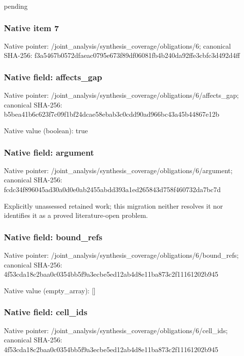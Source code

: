 \documentclass[10pt,a4paper]{article}
\begin{document}
\begingroup\raggedright\sloppy pending\par\endgroup

\subsubsection{Native item 7}
Native pointer: /joint\_\allowbreak{}analysis/synthesis\_\allowbreak{}coverage/obligations/6; canonical SHA-256: f3a5467b0572dfaeac0795e673f89df06081fb4b240da92ffe3cbfc3d492d4ff

\subsubsection{Native field: affects\_\allowbreak{}gap}
Native pointer: /joint\_\allowbreak{}analysis/synthesis\_\allowbreak{}coverage/obligations/6/affects\_\allowbreak{}gap; canonical SHA-256: b5bea41b6c623f7c09f1bf24dcae58ebab3c0cdd90ad966bc43a45b44867e12b

Native value (boolean): true

\subsubsection{Native field: argument}
Native pointer: /joint\_\allowbreak{}analysis/synthesis\_\allowbreak{}coverage/obligations/6/argument; canonical SHA-256: fcdc34f896045ad30a0d0e0ab2455abdd393a1ed265843d758f460732da7bc7d

\begingroup\raggedright\sloppy Explicitly unassessed retained work;\allowbreak{} this migration neither resolves it nor identifies it as a proved literature-open problem.\par\endgroup

\subsubsection{Native field: bound\_\allowbreak{}refs}
Native pointer: /joint\_\allowbreak{}analysis/synthesis\_\allowbreak{}coverage/obligations/6/bound\_\allowbreak{}refs; canonical SHA-256: 4f53cda18c2baa0c0354bb5f9a3ecbe5ed12ab4d8e11ba873c2f11161202b945

Native value (empty\_\allowbreak{}array): []

\subsubsection{Native field: cell\_\allowbreak{}ids}
Native pointer: /joint\_\allowbreak{}analysis/synthesis\_\allowbreak{}coverage/obligations/6/cell\_\allowbreak{}ids; canonical SHA-256: 4f53cda18c2baa0c0354bb5f9a3ecbe5ed12ab4d8e11ba873c2f11161202b945
\end{document}
